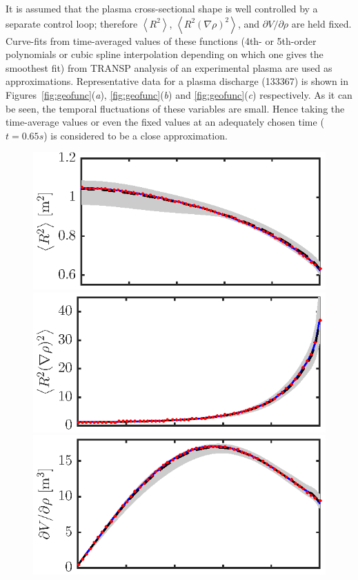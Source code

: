 \documentclass{iopart}
\begin{document}
It is assumed that the plasma cross-sectional shape is well controlled by a
separate control loop; therefore $\left< R^2 \right>$, $\left< R^2
  (\nabla\rho)^2 \right>$, and $\partial V/\partial \rho$ are held fixed.
Curve-fits from time-averaged values of these functions (4th- or 5th-order
polynomials or cubic spline interpolation depending on which one gives the smoothest fit) from TRANSP analysis of an experimental
plasma are used as approximations.
%
Representative data for a plasma discharge (133367) is shown in
Figures~\ref{fig:geofunc}(\emph{a}), \ref{fig:geofunc}(\emph{b}) and
\ref{fig:geofunc}(\emph{c}) respectively.  As it can be seen, the temporal
fluctuations of these variables are small. Hence taking the time-average values
or even the fixed values at an adequately chosen time ($t = 0.65 s$) is
considered to be a close approximation.
%
\begin{figure} 
\includegraphics{imene_figs/fig1a} \hspace{-3em} \\
\includegraphics{imene_figs/fig1b} \hspace{-3em} \\
\includegraphics{imene_figs/fig1c} \hspace{-3em} \\[-.4em]

\end{figure}
\end{document}
